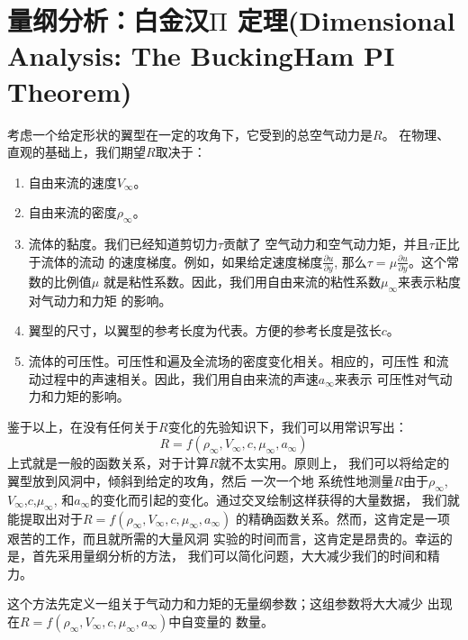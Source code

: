 \section{量纲分析：白金汉\texorpdfstring{$\mathrm{\Pi}$}{Π}  定理(Dimensional Analysis: The BuckingHam PI Theorem)}
考虑一个给定形状的翼型在一定的攻角下，它受到的总空气动力是$R$。
在物理、直观的基础上，我们期望$R$取决于：
\begin{enumerate}
  \item 自由来流的速度$V_\infty$。
  \item 自由来流的密度$\rho_\infty$。
  \item 流体的黏度。我们已经知道剪切力$\tau$贡献了
    空气动力和空气动力矩，并且$\tau$正比于流体的流动
    的速度梯度。例如，如果给定速度梯度$\frac{\partial u}{\partial y}$,
    那么$\tau=\mu \frac{\partial u}{\partial y}$。这个常数的比例值$\mu$
    就是粘性系数。因此，我们用自由来流的粘性系数$\mu_\infty$来表示粘度对气动力和力矩
    的影响。
  \item 翼型的尺寸，以翼型的参考长度为代表。方便的参考长度是弦长$c$。
  \item 流体的可压性。可压性和遍及全流场的密度变化相关。相应的，可压性
    和流动过程中的声速相关。因此，我们用自由来流的声速$a_\infty$来表示
    可压性对气动力和力矩的影响。
\end{enumerate}

鉴于以上，在没有任何关于$R$变化的先验知识下，我们可以用常识写出：
\[
  R=f(\rho_\infty,V_\infty,c,\mu_\infty,a_\infty)
\]
上式就是一般的函数关系，对于计算$R$就不太实用。原则上，
我们可以将给定的翼型放到风洞中，倾斜到给定的攻角，然后
一次一个地
系统性地测量$R$由于$\rho_\infty$,$V_\infty$,$c$,$\mu_\infty$,
和$a_\infty$的变化而引起的变化。通过交叉绘制这样获得的大量数据，
我们就能提取出对于$R=f(\rho_\infty,V_\infty,c,\mu_\infty,a_\infty)$
的精确函数关系。然而，这肯定是一项艰苦的工作，而且就所需的大量风洞
实验的时间而言，这肯定是昂贵的。幸运的是，首先采用量纲分析的方法，
我们可以简化问题，大大减少我们的时间和精力。

这个方法先定义一组关于气动力和力矩的无量纲参数；这组参数将大大减少
出现在$R=f(\rho_\infty,V_\infty,c,\mu_\infty,a_\infty)$中自变量的
数量。

